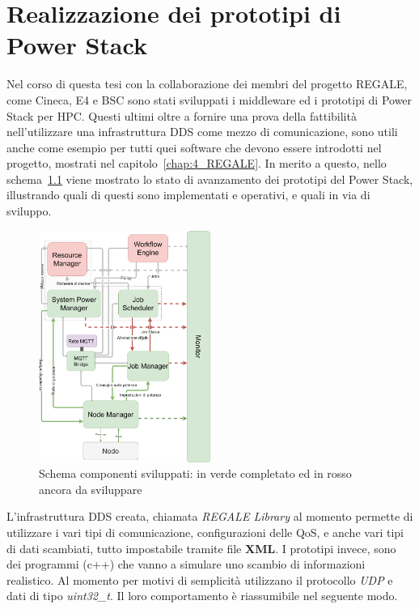 \chapter{Realizzazione dei prototipi di Power Stack}
Nel corso di questa tesi con la collaborazione dei membri del progetto REGALE, come Cineca\cite{Cineca}, E4\cite{E4} e BSC\cite{BSC} sono stati sviluppati i middleware ed i prototipi di Power Stack per HPC. 
Questi ultimi oltre a fornire una prova della fattibilità nell'utilizzare una infrastruttura DDS come mezzo di comunicazione, sono utili anche come esempio per tutti quei software che devono essere introdotti nel progetto, mostrati nel capitolo~\ref{chap:4_REGALE}.
In merito a questo, nello schema~\ref{fig:schema_global_dummy_implementati} viene mostrato lo stato di avanzamento dei prototipi del Power Stack, illustrando quali di questi sono implementati e operativi, e quali in via di sviluppo.

\begin{figure}[H]
    \centering
    \includegraphics[width=0.50\textwidth]{./img/SchemaPowerStack_perdummy.drawio.png}
    \caption{Schema componenti sviluppati: in verde completato ed in rosso ancora da sviluppare}
    \label{fig:schema_global_dummy_implementati}
\end{figure}
L'infrastruttura DDS creata, chiamata \emph{REGALE Library}\cite{RegaleLibrary} al momento permette di utilizzare i vari tipi di comunicazione, configurazioni delle QoS, e anche vari tipi di dati scambiati, tutto impostabile tramite file \textbf{XML}.
I prototipi invece, sono dei programmi (c++) che vanno a simulare uno scambio di informazioni realistico. Al momento per motivi di semplicità utilizzano il protocollo \emph{UDP} e dati di tipo \emph{uint32\_t}. Il loro comportamento è riassumibile nel seguente modo.


